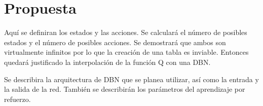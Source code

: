 \chapter{Propuesta}

Aquí se definiran los estados y las acciones. Se calculará el número de posibles estados y el número de posibles acciones. Se demostrará que ambos son virtualmente infinitos por lo que la creación de una tabla es inviable. Entonces quedará justificado la interpolación de la función Q con una \ac{DBN}.

Se describira la arquitectura de \ac{DBN} que se planea utilizar, así como la entrada y la salida de la red. También se describirán los parámetros del aprendizaje por refuerzo.

